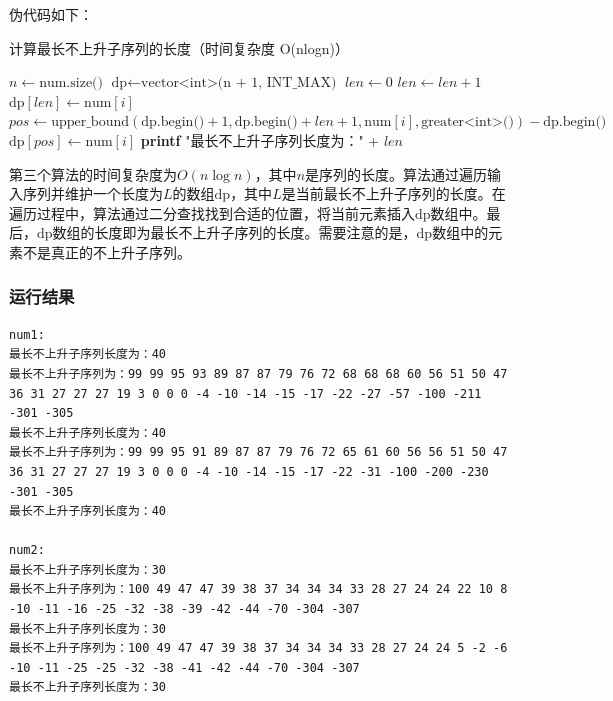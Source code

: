 \documentclass[lang=cn,11pt,a4paper]{elegantpaper}
\begin{document}
伪代码如下：
\begin{algorithm}[H]
\caption{计算最长不上升子序列的长度（时间复杂度 O(nlogn)）}
\begin{algorithmic}[1]
    \State $n \gets \text{num.size()}$
    \State $\text{dp} \gets \text{vector<int>(n + 1, INT\_MAX)}$ 
    \State $len \gets 0$
         
            \State $len \gets len + 1$
            \State $\text{dp}[len] \gets \text{num}[i]$
        \Else {}
            \State $pos \gets \text{upper\_bound}(\text{dp.begin()} + 1, \text{dp.begin()} + len + 1, \text{num}[i], \text{greater<int>()}) - \text{dp.begin()}$
            \State $\text{dp}[pos] \gets \text{num}[i]$
        \EndIf
    \EndFor
    \State \textbf{printf} "最长不上升子序列长度为：" + $len$
\EndProcedure
\end{algorithmic}
\end{algorithm}

第三个算法的时间复杂度为$O(n\log n)$，其中$n$是序列的长度。算法通过遍历输入序列并维护一个长度为$L$的数组$\text{dp}$，其中$L$是当前最长不上升子序列的长度。在遍历过程中，算法通过二分查找找到合适的位置，将当前元素插入$\text{dp}$数组中。最后，$\text{dp}$数组的长度即为最长不上升子序列的长度。需要注意的是，dp数组中的元素不是真正的不上升子序列。

\subsubsection{运行结果}
\begin{lstlisting}[language=text]
num1:
最长不上升子序列长度为：40
最长不上升子序列为：99 99 95 93 89 87 87 79 76 72 68 68 68 60 56 51 50 47 36 31 27 27 27 19 3 0 0 0 -4 -10 -14 -15 -17 -22 -27 -57 -100 -211 -301 -305
最长不上升子序列长度为：40
最长不上升子序列为：99 99 95 91 89 87 87 79 76 72 65 61 60 56 56 51 50 47 36 31 27 27 27 19 3 0 0 0 -4 -10 -14 -15 -17 -22 -31 -100 -200 -230 -301 -305
最长不上升子序列长度为：40

num2:
最长不上升子序列长度为：30
最长不上升子序列为：100 49 47 47 39 38 37 34 34 34 33 28 27 24 24 22 10 8 -10 -11 -16 -25 -32 -38 -39 -42 -44 -70 -304 -307
最长不上升子序列长度为：30
最长不上升子序列为：100 49 47 47 39 38 37 34 34 34 33 28 27 24 24 5 -2 -6 -10 -11 -25 -25 -32 -38 -41 -42 -44 -70 -304 -307
最长不上升子序列长度为：30
\end{lstlisting}
\end{document}
